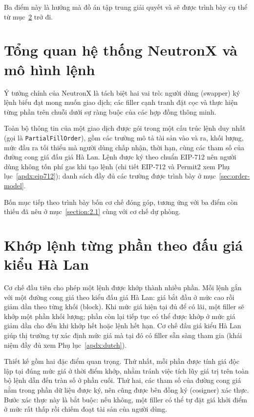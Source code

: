 \documentclass[../DoAn.tex]{subfiles}
\begin{document}
Ba điểm này là hướng mà đồ án tập trung giải quyết và sẽ được trình bày cụ thể từ mục~\ref{section:2.3} trở đi.

\section{Tổng quan hệ thống NeutronX và mô hình lệnh}
\label{section:2.2}

Ý tưởng chính của NeutronX là tách biệt hai vai trò: người dùng (swapper) ký lệnh biểu đạt mong muốn giao dịch; các filler cạnh tranh đặt cọc và thực hiện từng phần trên chuỗi dưới sự ràng buộc của các hợp đồng thông minh.

Toàn bộ thông tin của một giao dịch được gói trong một cấu trúc lệnh duy nhất (gọi là \texttt{PartialFillOrder}), gồm các trường mô tả tài sản vào và ra, khối lượng, mức đầu ra tối thiểu mà người dùng chấp nhận, thời hạn, cùng các tham số của đường cong giá đấu giá Hà Lan. Lệnh được ký theo chuẩn EIP-712 nên người dùng không tốn phí gas khi tạo lệnh (chi tiết EIP-712 và Permit2 xem Phụ lục~\ref{apdx:eip712}); danh sách đầy đủ các trường được trình bày ở mục~\ref{sec:order-model}.

Bốn mục tiếp theo trình bày bốn cơ chế đóng góp, tương ứng với ba điểm còn thiếu đã nêu ở mục~\ref{section:2.1} cùng với cơ chế dự phòng.

\section{Khớp lệnh từng phần theo đấu giá kiểu Hà Lan}
\label{section:2.3}

Cơ chế đầu tiên cho phép một lệnh được khớp thành nhiều phần. Mỗi lệnh gắn với một đường cong giá theo kiểu đấu giá Hà Lan: giá bắt đầu ở mức cao rồi giảm dần theo từng khối (block). Khi mức giá hiện tại đủ để có lãi, một filler sẽ khớp một phần khối lượng; phần còn lại tiếp tục có thể được khớp ở mức giá giảm dần cho đến khi khớp hết hoặc lệnh hết hạn. Cơ chế đấu giá kiểu Hà Lan giúp thị trường tự xác định mức giá mà tại đó có filler sẵn sàng tham gia (khái niệm đầy đủ xem Phụ lục~\ref{apdx:dutch}).

Thiết kế gồm hai đặc điểm quan trọng. Thứ nhất, mỗi phần được tính giá độc lập tại đúng mức giá ở thời điểm khớp, nhằm tránh việc tích lũy giá trị trên toàn bộ lệnh dẫn đến tràn số ở phần cuối. Thứ hai, các tham số của đường cong giá nằm trong phần dữ liệu được ký, nên cũng được bên đồng ký (cosigner) xác thực. Bước xác thực này là bắt buộc: nếu không, một filler có thể tự đặt giá khởi điểm ở mức rất thấp rồi chiếm đoạt tài sản của người dùng.
\end{document}
